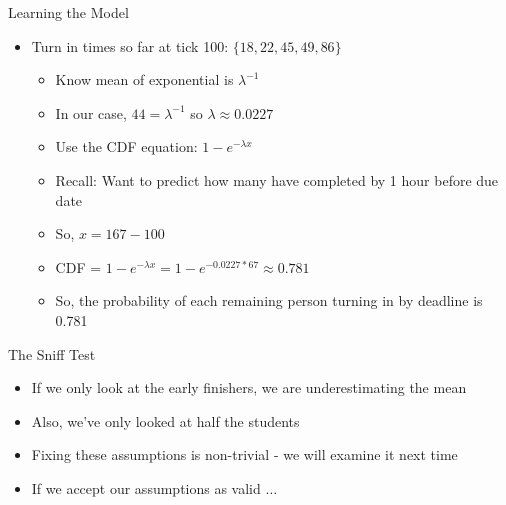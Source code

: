 \documentclass[aspectratio=169]{beamer}
\begin{document}
\begin{frame}{Learning the Model}

\begin{itemize}
	\item Turn in times so far at tick 100: $\{18, 22, 45, 49, 86\}$
	\begin{itemize}
	\item Know mean of exponential is $\lambda^{-1}$
	\item In our case, $44 = \lambda^{-1}$ so $\lambda \approx 0.0227$
	\item Use the CDF equation: $1 - e^{-\lambda x}$
	\vspace{1em}
	\item Recall: Want to predict how many have completed by 1 hour before due date
	\item So, $x = 167-100$
	\item CDF =  $1 - e^{-\lambda x} =  1 - e^{-0.0227 * 67}  \approx  0.781$ 
	\item So, the probability of each remaining person turning in by deadline is 0.781
	\end{itemize}
\end{itemize}
\end{frame}
\begin{frame}{The Sniff Test}

\begin{itemize}
	\item If we only look at the early finishers, we are underestimating the mean
	\item Also, we've only looked at half the students
	\item Fixing these assumptions is non-trivial - we will examine it next time
	\item If we accept our assumptions as valid $\dots$
\end{itemize}
\end{frame}
\end{document}

